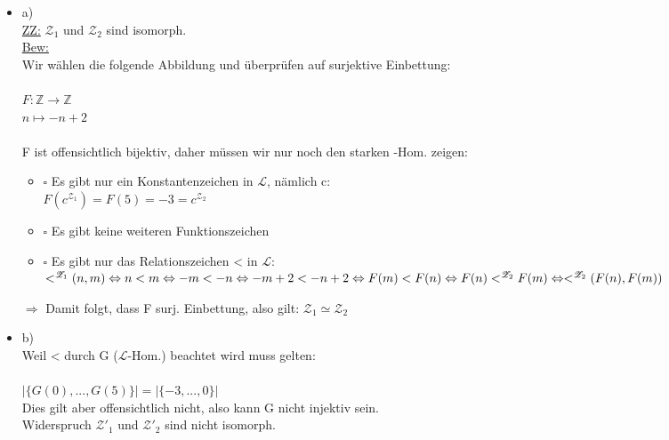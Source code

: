 \documentclass[a4paper]{scrartcl}
\begin{document}
    \begin{itemize}
        \item a)\\
            \underline{ZZ:} $\mathscr{Z}_1$ und $\mathscr{Z}_2$ sind isomorph.\\
            \underline{Bew:}\\
            Wir wählen die folgende Abbildung und überprüfen auf surjektive Einbettung:\\
            \\$F: \mathds{Z} \rightarrow \mathds{Z}$\\
            $n \mapsto -n + 2$\\

            \\F ist offensichtlich bijektiv, daher müssen wir nur noch den starken -Hom. zeigen:\\

            \begin{itemize}
                \item $\square$ Es gibt nur ein Konstantenzeichen in $\mathscr{L}$, nämlich c:\\
                    $F(c^{\mathscr{Z}_1}) = F(5) = -3 = c^{\mathscr{Z}_2}$
                \item $\square$ Es gibt keine weiteren Funktionszeichen
                \item $\square$ Es gibt nur das Relationszeichen < in $\mathscr{L}$:\\
                    $<^{\mathscr{Z}_1}(n,m)\\ \Leftrightarrow n < m\\ \Leftrightarrow -m < -n\\ \Leftrightarrow -m + 2 < -n + 2\\ \Leftrightarrow F(m) < F(n)\\
                    \Leftrightarrow F(n) <^{\mathscr{Z}_2} F(m)\\ \Leftrightarrow <^{\mathscr{Z}_2}(F(n), F(m))$

            \end{itemize} 
            
            $\Rightarrow$ Damit folgt, dass F surj. Einbettung, also gilt: $\mathscr{Z}_1 \simeq \mathscr{Z}_2$

        \item b)\\
            Weil < durch G ($\mathscr{L}$-Hom.) beachtet wird muss gelten:\\
            \\$|\{G(0),..., G(5)\}| = |\{-3,...,0\}|$\\
            Dies gilt aber offensichtlich nicht, also kann G nicht injektiv sein.\\
            Widerspruch $\mathscr{Z'}_1$ und $\mathscr{Z'}_2$ sind nicht isomorph.\\


\end{itemize}
\end{document}
